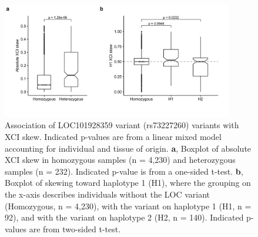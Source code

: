 \begin{figure}[ht!]
    \centering
    \includegraphics[width=0.9\textwidth]{chapter4/Figures/Supplementary_Figure_4.png}
    \caption{
        Association of LOC101928359 variant (rs73227260) variants with XCI skew. Indicated p-values are from a linear mixed model accounting for individual and tissue of origin.
        \textbf{a}, Boxplot of absolute XCI skew in homozygous samples (n = 4,230) and heterozygous samples (n = 232). Indicated p-value is from a one-sided t-test.
        \textbf{b}, Boxplot of skewing toward haplotype 1 (H1), where the grouping on the x-axis describes individuals without the LOC variant (Homozygous, n = 4,230), with the variant on haplotype 1 (H1, n = 92), and with the variant on haplotype 2 (H2, n = 140). Indicated p-values are from two-sided t-test.  
    }
    \label{fig:supp_fig4.4}
\end{figure}